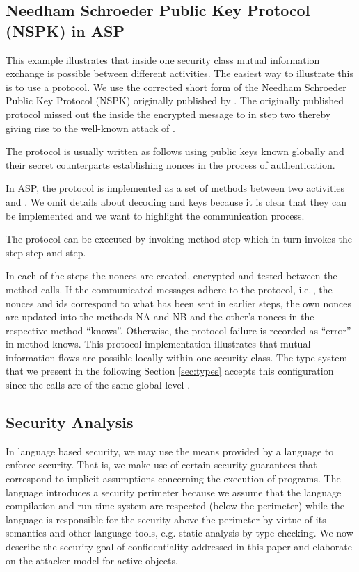 \documentclass[10pt, conference, compsocconf]{IEEEtran}
\newcommand\aspfun{ASP\ }
\newcommand\aspfunp{ASP}
\newcommand\ie{i.e.\!\,, }
\begin{document}
{\subsection*{Needham Schroeder Public Key Protocol (NSPK) in \aspfun}
This example illustrates that inside one security class mutual information
exchange is possible between different activities. The easiest way to illustrate this 
is to use a protocol.
We use the corrected short form of the Needham Schroeder Public Key Protocol (NSPK) 
originally published by \cite{Needham78usingencryption}.
The originally published protocol missed out the  inside the encrypted message to  
in step two thereby giving rise to the well-known attack of \cite{Lowe95anattack}.

The protocol is usually written as follows using public keys
 known globally and their secret counterparts  establishing 
nonces  in the process of authentication.

In \aspfunp, the protocol is implemented as a set of methods between two activities  and . 
We omit details about decoding and keys because it is clear that they can be implemented and we want to highlight the communication process.

\begin{small}

\end{small}
The protocol can be executed by invoking method step which in turn invokes
the step step and step.
\begin{small}

\end{small}
 In each of the steps the nonces are created,
encrypted and tested between the method calls. If the communicated messages adhere to
the protocol, \ie the nonces and ids correspond to what has been sent in earlier steps,
the own nonces are updated into the methods NA and NB and the other's
nonces in the respective method ``knows''. Otherwise, the 
protocol failure is recorded as ``error'' in method knows. This protocol implementation 
illustrates that mutual information flows are possible locally within one security class. 
The type system that we present in the following Section \ref{sec:types}
accepts this configuration since the calls are of the same global level .

\subsection{Security Analysis}
\label{sec:sec}
In language based security, we may use the means provided by a language to enforce security.
That is, we make use of certain security guarantees that correspond to implicit assumptions 
concerning the execution of programs. The language introduces a security perimeter because we
assume that the language compilation and run-time system are respected (below the perimeter) while
the language is responsible for the security above the perimeter by virtue of its semantics
and other language tools, e.g. static analysis by type checking.
We now describe the security goal of confidentiality addressed in this paper and elaborate
on the attacker model for active objects.

}
\end{document}
